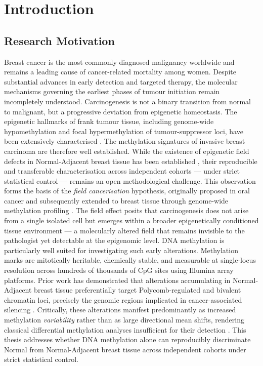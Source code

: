 \chapter{Introduction}
\label{chap:introduction}


\section{Research Motivation  }

Breast cancer is the most commonly diagnosed malignancy worldwide
and remains a leading cause of cancer-related mortality among women.
Despite substantial advances in early detection and targeted therapy,
the molecular mechanisms governing the earliest phases of tumour
initiation remain incompletely understood.
Carcinogenesis is not a binary transition from normal to malignant,
but a progressive deviation from epigenetic homeostasis.
The epigenetic hallmarks of frank tumour tissue, including
genome-wide hypomethylation and focal hypermethylation of
tumour-suppressor loci, have been extensively characterised
\cite{ehrlich2002,bird2002}. The methylation signatures of
invasive breast carcinoma are therefore well established.
While the existence of epigenetic field defects in Normal-Adjacent
breast tissue has been established \cite{Teschendorff2016fielddefects},
their reproducible and transferable characterisation across
independent cohorts — under strict statistical control —
remains an open methodological challenge.
This observation forms the basis of the \textit{field cancerisation}
hypothesis, originally proposed in oral cancer and subsequently
extended to breast tissue through genome-wide methylation profiling
\cite{Teschendorff2016fielddefects}. The field effect posits that carcinogenesis
does not arise from a single isolated cell but emerges within a
broader epigenetically conditioned tissue environment —
a molecularly altered field that remains invisible to the pathologist
yet detectable at the epigenomic level.
DNA methylation is particularly well suited for investigating
such early alterations. Methylation marks are mitotically heritable,
chemically stable, and measurable at single-locus resolution
across hundreds of thousands of CpG sites using Illumina array
platforms. Prior work has demonstrated that alterations
accumulating in Normal-Adjacent breast tissue preferentially
target Polycomb-regulated and bivalent chromatin loci,
precisely the genomic regions implicated in cancer-associated
silencing \cite{Teschendorff2016fielddefects,Teschendorff2010}.
Critically, these alterations manifest predominantly as
increased methylation \emph{variability} rather than as large
directional mean shifts, rendering classical differential
methylation analyses insufficient for their detection
\cite{Teschendorff2014}.
This thesis addresses whether DNA methylation alone can
reproducibly discriminate Normal from Normal-Adjacent breast
tissue across independent cohorts under strict statistical control.


